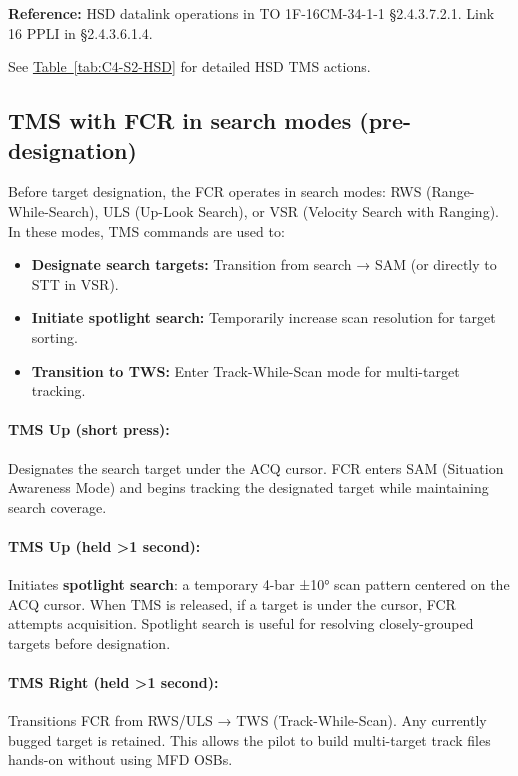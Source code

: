 \documentclass[11pt, a4paper, twoside]{report}
\newcommand{\tabref}[1]{\hyperref[#1]{Table~\ref*{#1}}}
\begin{document}
\textbf{Reference:} HSD datalink operations in TO 1F-16CM-34-1-1 \S2.4.3.7.2.1. 
Link 16 PPLI in \S2.4.3.6.1.4.

See \tabref{tab:C4-S2-HSD} for detailed HSD TMS actions.

\subsection{TMS with FCR in search modes (pre-designation)}
\label{sec:C4-S2-S2}

Before target designation, the FCR operates in search modes: RWS (Range-While-Search), ULS (Up-Look Search), or VSR (Velocity Search with Ranging). In these modes, TMS commands are used to:
\begin{itemize}
    \item \textbf{Designate search targets:} Transition from search → SAM (or directly to STT in VSR).
    \item \textbf{Initiate spotlight search:} Temporarily increase scan resolution for target sorting.
    \item \textbf{Transition to TWS:} Enter Track-While-Scan mode for multi-target tracking.
\end{itemize}

\paragraph{TMS Up (short press):}
Designates the search target under the ACQ cursor. FCR enters SAM (Situation Awareness Mode) and begins tracking the designated target while maintaining search coverage.

\paragraph{TMS Up (held >1 second):}
Initiates \textbf{spotlight search}: a temporary 4-bar ±10° scan pattern centered on the ACQ cursor. When TMS is released, if a target is under the cursor, FCR attempts acquisition. Spotlight search is useful for resolving closely-grouped targets before designation.

\paragraph{TMS Right (held >1 second):}
Transitions FCR from RWS/ULS → TWS (Track-While-Scan). Any currently bugged target is retained. This allows the pilot to build multi-target track files hands-on without using MFD OSBs.
\end{document}
